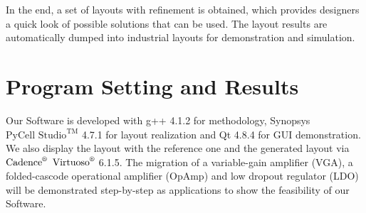   In the end, a set of layouts with refinement is obtained, which provides designers a quick look of possible solutions that can be used. The layout results are automatically dumped into industrial layouts for demonstration and simulation. 


\section{Program Setting and Results}
  
  Our Software is developed with g++ 4.1.2 for methodology, Synopsys $\text{PyCell Studio}^{\text{TM} }$ 4.7.1 for layout realization and Qt 4.8.4 for GUI demonstration. We also display the layout with the reference one and the generated layout via $\text{Cadence}^{\text{\textregistered}}$ $\text{Virtuoso}^{\text{\textregistered}}$ 6.1.5. The migration of a variable-gain amplifier (VGA), a folded-cascode operational amplifier (OpAmp) and low dropout regulator (LDO) will be demonstrated step-by-step as applications to show the feasibility of our Software. 


